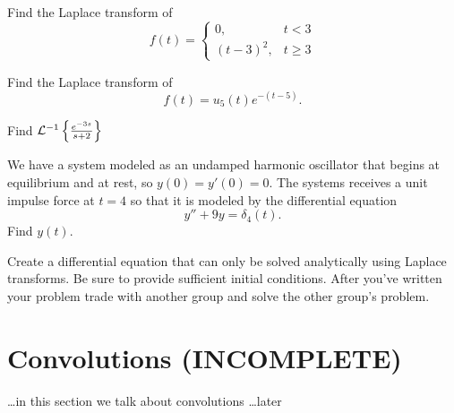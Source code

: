 \begin{problem}
    Find the Laplace transform of
    \[ f(t) = \left\{ \begin{array}{cc} 0, & t < 3 \\ (t-3)^2, & t \ge 3 \end{array} \right.
    \]
\end{problem}

\begin{problem}
    Find the Laplace transform of
    \[ f(t) = u_5(t) e^{-(t-5)}. \]
\end{problem}
\solution{
    \[ \lap{u_5(t) e^{-(t-5)}} = \frac{e^{-5s}}{s+1} \]
}

\begin{problem}
    Find $\mathcal{L}^{-1}\left\{ \frac{e^{-3s}}{s+2} \right\}$
\end{problem}
\solution{
    \[ \lapinv{\frac{e^{-3s}}{s+2}} = u_3(t) e^{-2(t-3)} \]
}



\begin{problem}
    We have a system modeled as an undamped harmonic oscillator that begins at equilibrium
    and at rest, so $y(0) = y'(0) = 0$.  The systems receives a unit impulse force at $t=4$ so
    that it is modeled by the differential equation
    \[ y'' + 9y = \delta_4(t). \]
    Find $y(t)$.
\end{problem}
\solution{
    \[ y(t) = u_4(t) \sin(3(t-4)). \]
}

\begin{problem}
    Create a differential equation that can only be solved analytically using Laplace
    transforms.  Be sure to provide sufficient initial conditions.  After you've written
    your problem trade with another group and solve the other group's problem.
\end{problem}


\section{Convolutions (INCOMPLETE)}
\ldots in this section we talk about convolutions \ldots later

